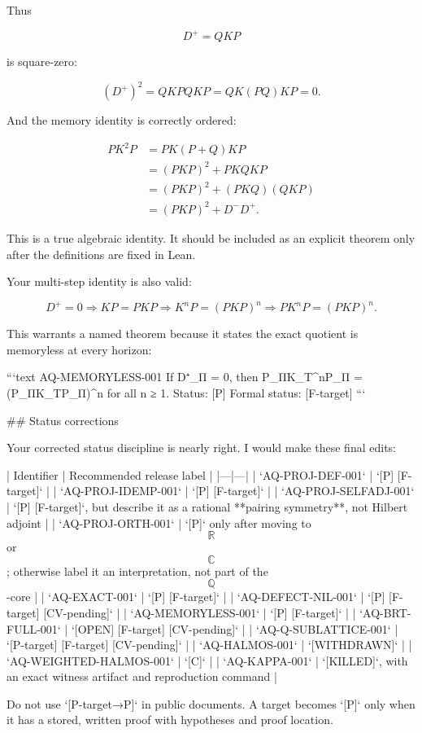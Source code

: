 Thus

$$
D^+=QKP
$$

is square-zero:

$$
(D^+)^2
=
QKPQKP
=
QK(PQ)KP
=
0.
$$

And the memory identity is correctly ordered:

$$
\begin{aligned}
PK^2P
&=
PK(P+Q)KP\\
&=
(PKP)^2+PKQKP\\
&=
(PKP)^2+(PKQ)(QKP)\\
&=
(PKP)^2+D^-D^+.
\end{aligned}
$$

This is a true algebraic identity. It should be included as an explicit theorem only after the definitions are fixed in Lean.

Your multi-step identity is also valid:

$$
D^+=0
\Longrightarrow
KP=PKP
\Longrightarrow
K^nP=(PKP)^n
\Longrightarrow
PK^nP=(PKP)^n.
$$

This warrants a named theorem because it states the exact quotient is memoryless at every horizon:

```text
AQ-MEMORYLESS-001
If D⁺_Π = 0, then P_ΠK_T^nP_Π = (P_ΠK_TP_Π)^n for all n ≥ 1.
Status: [P]
Formal status: [F-target]
```

## Status corrections

Your corrected status discipline is nearly right. I would make these final edits:

| Identifier | Recommended release label |
|---|---|
| `AQ-PROJ-DEF-001` | `[P] [F-target]` |
| `AQ-PROJ-IDEMP-001` | `[P] [F-target]` |
| `AQ-PROJ-SELFADJ-001` | `[P] [F-target]`, but describe it as a rational **pairing symmetry**, not Hilbert adjoint |
| `AQ-PROJ-ORTH-001` | `[P]` only after moving to $$\mathbb R$$ or $$\mathbb C$$; otherwise label it an interpretation, not part of the $$\mathbb Q$$-core |
| `AQ-EXACT-001` | `[P] [F-target]` |
| `AQ-DEFECT-NIL-001` | `[P] [F-target] [CV-pending]` |
| `AQ-MEMORYLESS-001` | `[P] [F-target]` |
| `AQ-BRT-FULL-001` | `[OPEN] [F-target] [CV-pending]` |
| `AQ-Q-SUBLATTICE-001` | `[P-target] [F-target] [CV-pending]` |
| `AQ-HALMOS-001` | `[WITHDRAWN]` |
| `AQ-WEIGHTED-HALMOS-001` | `[C]` |
| `AQ-KAPPA-001` | `[KILLED]`, with an exact witness artifact and reproduction command |

Do not use `[P-target→P]` in public documents. A target becomes `[P]` only when it has a stored, written proof with hypotheses and proof location.

